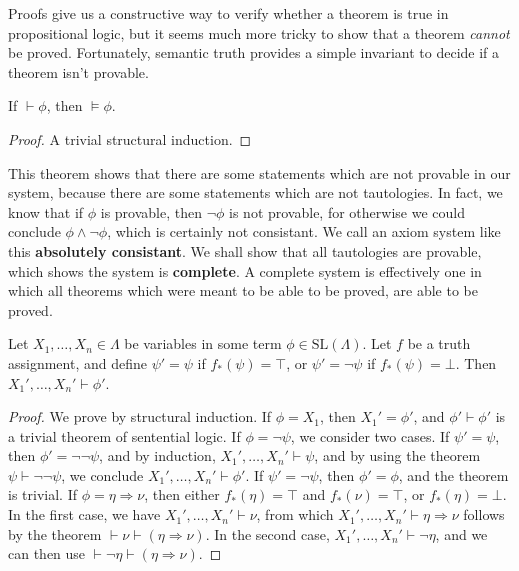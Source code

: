 Proofs give us a constructive way to verify whether a theorem is true in propositional logic, but it seems much more tricky to show that a theorem {\it cannot} be proved. Fortunately, semantic truth provides a simple invariant to decide if a theorem isn't provable.

\begin{theorem}
    If $\vdash \phi$, then $\vDash \phi$.
\end{theorem}
\begin{proof}
    A trivial structural induction.
\end{proof}

This theorem shows that there are some statements which are not provable in our system, because there are some statements which are not tautologies. In fact, we know that if $\phi$ is provable, then $\neg \phi$ is not provable, for otherwise we could conclude $\phi \wedge \neg \phi$, which is certainly not consistant. We call an axiom system like this {\bf absolutely consistant}. We shall show that all tautologies are provable, which shows the system is {\bf complete}. A complete system is effectively one in which all theorems which were meant to be able to be proved, are able to be proved.

\begin{lemma}
    Let $X_1, \dots, X_n \in \Lambda$ be variables in some term $\phi \in \text{SL}(\Lambda)$. Let $f$ be a truth assignment, and define $\psi' = \psi$ if $f_*(\psi) = \top$, or $\psi' = \neg \psi$ if $f_*(\psi) = \bot$. Then $X_1', \dots, X_n' \vdash \phi'$.
\end{lemma}
\begin{proof}
    We prove by structural induction. If $\phi = X_1$, then $X_1' = \phi'$, and $\phi' \vdash \phi'$ is a trivial theorem of sentential logic. If $\phi = \neg \psi$, we consider two cases. If $\psi' = \psi$, then $\phi' = \neg \neg \psi$, and by induction, $X_1', \dots, X_n' \vdash \psi$, and by using the theorem $\psi \vdash \neg \neg \psi$, we conclude $X_1', \dots, X_n' \vdash \phi'$. If $\psi' = \neg \psi$, then $\phi' = \phi$, and the theorem is trivial. If $\phi = \eta \Rightarrow \nu$, then either $f_*(\eta) = \top$ and $f_*(\nu) = \top$, or $f_*(\eta) = \bot$. In the first case, we have $X_1', \dots, X_n' \vdash \nu$, from which $X_1', \dots, X_n' \vdash \eta \Rightarrow \nu$ follows by the theorem $\vdash \nu \vdash (\eta \Rightarrow \nu)$. In the second case, $X_1', \dots, X_n' \vdash \neg \eta$, and we can then use $\vdash \neg \eta \vdash (\eta \Rightarrow \nu)$.
\end{proof}

